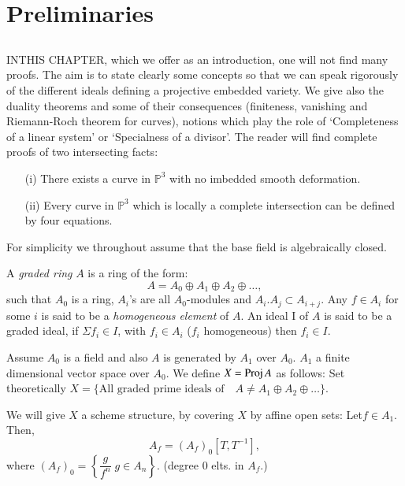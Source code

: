 

\chapter{Preliminaries}\label{chap1}

\section{}

IN\pageoriginale THIS CHAPTER, which we offer as an introduction, one
will not find many proofs. The aim is to state clearly some concepts
so that we can speak rigorously of the different ideals defining a
projective embedded variety. We give also the duality theorems and
some of their consequences (finiteness, vanishing and Riemann-Roch
theorem for curves), notions which play the role of `Completeness of a
linear system' or `Specialness of a  divisor'. The reader will find
complete proofs of two intersecting facts:
\begin{itemize}
\item [(i)] There exists a curve in $\mathbb{P}^3$ with no imbedded
smooth deformation. 
\item [(ii)] Every curve in $\mathbb{P}^3$ which is locally a complete
  intersection can be defined by four equations.
\end{itemize}
For simplicity we throughout assume that the base field is
algebraically closed. 

A {\it graded ring} $A$ is a ring of the form:
$$
A=A_0\oplus A_1\oplus A_2\oplus \ldots,
$$
such that $A_0$ is a ring, $A_i$'s are all $A_0$-modules and $A_i.A_j
\subset A_{i+j}$. Any $f\in A_i$ for some $i$ is said to be a {\it
homogeneous element} of $A$. An ideal I of $A$ is said to be a graded
ideal, if $\Sigma f_i\in I$, with $f_i\in A_i$ (\ie $f_i$ homogeneous)
then $f_i\in I$. 

Assume $A_0$ is a field and also $A$ is generated by $A_1$ over
$A_0$. $A_1$ a finite dimensional vector space over $A_0$. We define
$X=\operatorname{Proj} A$ as follows: Set theoretically $X=\{\text{All graded prime
ideals of}\quad A\neq A_1\oplus A_2\oplus\ldots\}$. 

We will give $X$ a scheme structure, by covering $X$ by affine open
sets: Let\pageoriginale $f\in A_1$. Then,
\begin{equation}
A_f=(A_f)_0[T, T^{-1}],\tag{*}
\end{equation}
where $(A_f)_0=\left\{\dfrac{g}{f^n} \; g\in A_n \right\}$. (degree $0$ elts. in $A_f$.)

